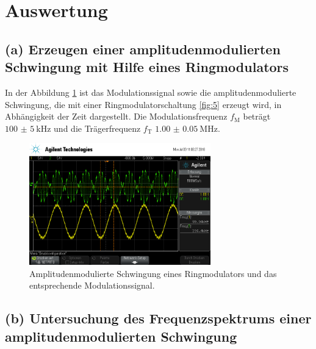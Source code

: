 \newpage
\section{Auswertung}
\label{sec:Auswertung}


\subsection{(a) Erzeugen einer amplitudenmodulierten Schwingung mit
Hilfe eines Ringmodulators}
\label{subsec:auswertung_a}
In der Abbildung \ref{fig:ringamp_zeit} ist das Modulationssignal
sowie die amplitudenmodulierte Schwingung, die mit einer Ringmodulatorschaltung \ref{fig:5}
erzeugt wird,
in Abhängigkeit der Zeit dargestellt.
Die Modulationsfrequenz $f_{\text{M}}$ beträgt $\SI{100(5)}{\kilo\hertz}$
und die Trägerfrequenz $f_{\text{T}}$ $\SI{1.00(5)}{\mega\hertz}$.

\begin{figure}
  \centering
  \includegraphics[width=0.7\textwidth]{osci/amp_ringmodulator.png}
  \caption{Amplitudenmodulierte
  Schwingung eines Ringmodulators und das entsprechende Modulationssignal.}
  \label{fig:ringamp_zeit}
\end{figure}

\FloatBarrier
\subsection{(b) Untersuchung des Frequenzspektrums einer
amplitudenmodulierten Schwingung}
\label{subsec:auswertung_b}

